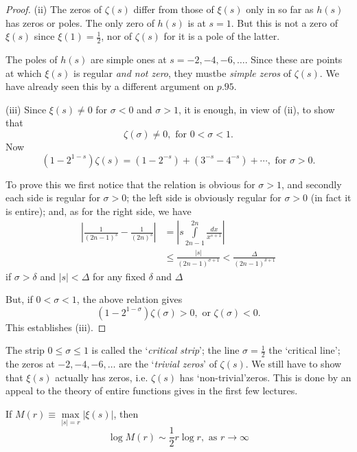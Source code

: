 \begin{proof}
(ii) The zeros of $\zeta(s)$ differ from those of $\xi (s)$ only in so
far as $h(s)$ has zeros or poles. The only zero of $h(s)$ is at
$s=1$. But this is not a zero of $\xi (s)$ since $\xi(1)=\frac{1}{2}$,
nor of $\zeta(s)$ for it is a pole of the latter.

The poles of $h(s)$ are simple ones at $s=-2, -4, -6, \ldots$. Since
these are points at which $\xi (s)$  is regular \textit{and not zero},
they must\pageoriginale be \textit{simple zeros} of $\zeta(s)$. We
have already seen this by a different argument on $p.95$.

(iii) Since $\xi(s)\neq 0$ for $\sigma <0$ and $\sigma >1$, it is
enough, in view of (ii), to show that
$$
\zeta(\sigma) \neq 0, \text{ for } 0 < \sigma <1.
$$
Now 
$$
(1-2^{1-s}) \zeta(s) = (1-2^{-s}) + (3^{-s} - 4^{-s}) + \cdots ,
\text{ for } \sigma > 0.
$$

To prove this we first notice that the relation is obvious for $\sigma
>1$, and secondly each side is regular for $\sigma >0$; the left side
is obviously regular for $\sigma >0$ (in fact it is entire); and, as
for the right side, we have
\begin{align*}
\left| \frac{1}{(2n-1)^s} - \frac{1}{(2n)^s} \right| & = \left|s
\int\limits^{2n}_{2n-1} \frac{dx}{x^{s+1}} \right|\\
& \leq \frac{|s|}{(2n-1)^{\sigma +1}} < \frac{\Delta}{(2n-1)^{\delta+1}}
\end{align*}
if $\sigma > \delta$ and $|s| < \Delta$ for any fixed $\delta$ and
$\Delta$ 

But, if $0 < \sigma < 1 $, the above relation gives
$$
(1-2^{1-\sigma}) \zeta(\sigma) >0, \text{ or } \zeta(\sigma) <0.
$$
This establishes (iii).
\end{proof}

\begin{remarks*}
The strip $0 \leq \sigma \leq 1$ is called the `\textit{critical
  strip}'; the line $\sigma = \frac{1}{2}$ the `critical line'; the
zeros at $-2, -4, -6, \ldots$ are the `\textit{trivial zeros}' of
$\zeta(s)$. We still have to show that $\xi(s)$ actually has zeros,
i.e. $\zeta(s)$ has `non-trivial'\pageoriginale zeros. This is done by
an appeal to the theory of entire functions gives in the first few
lectures.
\end{remarks*}

\begin{thm}\cite[p.56]{key11}\label{chap13:thm3}
If $M(r) \equiv \max\limits_{|s| =r} |\xi(s)|$, then 
$$
\log M(r) \sim \frac{1}{2} r \log r, \text{ as } r \to \infty
$$
\end{thm}

